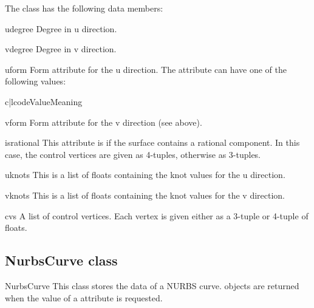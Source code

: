 The class has the following data members:

\begin{memberdesc}{udegree}
Degree in u direction.
\end{memberdesc}

\begin{memberdesc}{vdegree}
Degree in v direction.
\end{memberdesc}

\begin{memberdesc}{uform}
Form attribute for the u direction. The attribute can have one of the 
following values:

\begin{tableii}{c|l}{code}{Value}{Meaning}
\end{tableii}
\end{memberdesc}

\begin{memberdesc}{vform}
Form attribute for the v direction (see above).
\end{memberdesc}

\begin{memberdesc}{isrational}
This attribute is  if the surface contains a rational component.
In this case, the control vertices are given as 4-tuples, otherwise
as 3-tuples. 
\end{memberdesc}

\begin{memberdesc}{uknots}
This is a list of floats containing the knot values for the u direction.
\end{memberdesc}

\begin{memberdesc}{vknots}
This is a list of floats containing the knot values for the v direction.
\end{memberdesc}

\begin{memberdesc}{cvs}
A list of control vertices. Each vertex is given either as a 3-tuple or
4-tuple of floats.
\end{memberdesc}

\subsection{NurbsCurve class}
\label{nurbscurve}

\begin{classdesc*}{NurbsCurve}
This class stores the data of a NURBS curve.  objects
are returned when the value of a  attribute is requested.
\end{classdesc*}

